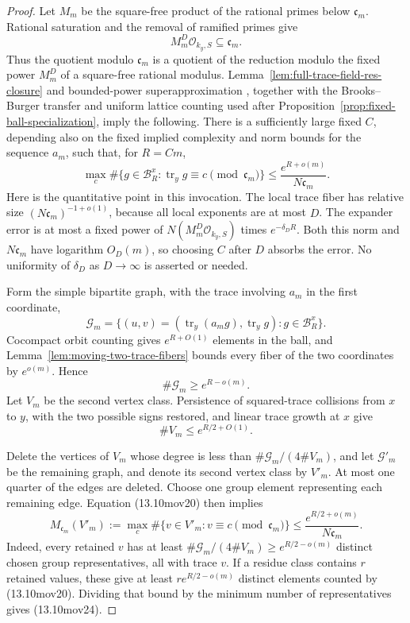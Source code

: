 \documentclass[11pt,reqno]{amsart}
\theoremstyle{definition}
\theoremstyle{remark}
\newcommand{\cO}{\mathcal O}
\newcommand{\Tr}{\operatorname{tr}}
\begin{document}
\begin{proof}
Let \(M_m\) be the square-free product of the rational primes below
\(\mathfrak c_m\).  Rational saturation and the removal of ramified primes
give
\[
 M_m^D\cO_{k_y,S}\subseteq\mathfrak c_m.
\tag{13.10mov19}
\]
Thus the quotient modulo \(\mathfrak c_m\) is a quotient of the reduction
modulo the fixed power \(M_m^D\) of a square-free rational modulus.
Lemma~\ref{lem:full-trace-field-res-closure} and bounded-power
superapproximation \cite{SalehiSuperII}, together with the
Brooks--Burger transfer and uniform lattice counting used after
Proposition~\ref{prop:fixed-ball-specialization}, imply the following.
There is a sufficiently large fixed \(C\), depending also on the fixed
implied complexity and norm bounds for the sequence \(a_m\), such that, for
\(R=Cm\),
\[
 \max_c\#\{g\in\mathcal B_R^x:
       \Tr_y g\equiv c\pmod{\mathfrak c_m}\}
 \le\frac{e^{R+o(m)}}{N\mathfrak c_m}.
\tag{13.10mov20}
\]
Here is the quantitative point in this invocation.  The local trace fiber
has relative size
\((N\mathfrak c_m)^{-1+o(1)}\), because all local exponents are at most
\(D\).  The expander error is at most a fixed power of
\(N(M_m^D\cO_{k_y,S})\) times \(e^{-\delta_DR}\).  Both this norm and
\(N\mathfrak c_m\) have logarithm \(O_D(m)\), so choosing \(C\) after
\(D\) absorbs the error.  No uniformity of \(\delta_D\) as \(D\to\infty\)
is asserted or needed.

Form the simple bipartite graph, with the trace involving \(a_m\) in the
first coordinate,
\[
 \mathcal G_m=
 \{(u,v)=(\Tr_y(a_mg),\Tr_yg):g\in\mathcal B_R^x\}.
\tag{13.10mov21}
\]
Cocompact orbit counting gives \(e^{R+O(1)}\) elements in the ball, and
Lemma~\ref{lem:moving-two-trace-fibers} bounds every fiber of the two
coordinates by \(e^{o(m)}\).  Hence
\[
 \#\mathcal G_m\ge e^{R-o(m)}.
\tag{13.10mov22}
\]
Let \(V_m\) be the second vertex class.  Persistence of squared-trace
collisions from \(x\) to \(y\), with the two possible signs restored, and
linear trace growth at \(x\) give
\[
 \#V_m\le e^{R/2+O(1)}.
\tag{13.10mov23}
\]

Delete the vertices of \(V_m\) whose degree is less than
\(\#\mathcal G_m/(4\#V_m)\), and let \(\mathcal G'_m\) be the remaining
graph, and denote its second vertex class by \(V'_m\).
At most one quarter of the edges are deleted.  Choose one group
element representing each remaining edge.  Equation (13.10mov20) then
implies
\[
 M_{\mathfrak c_m}(V'_m):=
 \max_c\#\{v\in V'_m:v\equiv c\pmod{\mathfrak c_m}\}
 \le\frac{e^{R/2+o(m)}}{N\mathfrak c_m}.
\tag{13.10mov24}
\]
Indeed, every retained \(v\) has at least
\(\#\mathcal G_m/(4\#V_m)\ge e^{R/2-o(m)}\) distinct chosen group
representatives, all with trace \(v\).  If a residue class contains \(r\)
retained values, these give at least \(r e^{R/2-o(m)}\) distinct elements
counted by (13.10mov20).  Dividing that bound by the minimum number of
representatives gives (13.10mov24).


\end{proof}
\end{document}
